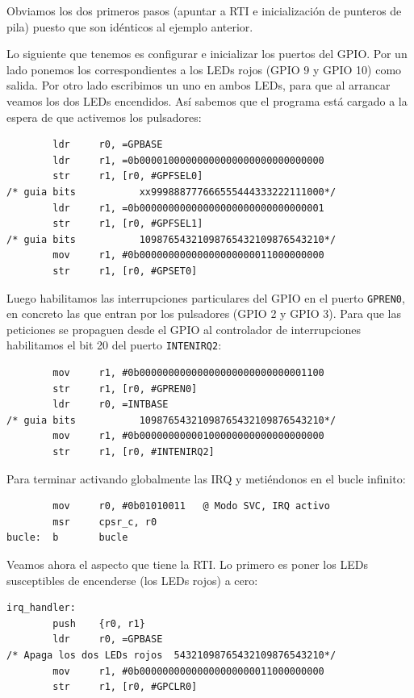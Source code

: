 Obviamos los dos primeros pasos (apuntar a RTI e inicialización de punteros de pila) puesto
que son idénticos al ejemplo anterior.

Lo siguiente que tenemos es configurar e inicializar los puertos del GPIO. Por un lado
ponemos los correspondientes a los LEDs rojos (GPIO 9 y GPIO 10) como salida. Por otro
lado escribimos un uno en ambos LEDs, para que al arrancar veamos los dos LEDs encendidos.
Así sabemos que el programa está cargado a la espera de que activemos los pulsadores:

\begin{lstlisting}
        ldr     r0, =GPBASE
        ldr     r1, =0b00001000000000000000000000000000
        str     r1, [r0, #GPFSEL0]
/* guia bits           xx999888777666555444333222111000*/
        ldr     r1, =0b00000000000000000000000000000001
        str     r1, [r0, #GPFSEL1]
/* guia bits           10987654321098765432109876543210*/
        mov     r1, #0b00000000000000000000011000000000
        str     r1, [r0, #GPSET0]
\end{lstlisting}

Luego habilitamos las interrupciones particulares del GPIO en el puerto
{\tt GPREN0}, en concreto las que entran por los pulsadores (GPIO 2 y GPIO 3). 
Para que las peticiones se propaguen desde el GPIO al controlador de interrupciones
habilitamos el bit 20 del puerto {\tt INTENIRQ2}:

\begin{lstlisting}
        mov     r1, #0b00000000000000000000000000001100
        str     r1, [r0, #GPREN0]
        ldr     r0, =INTBASE
/* guia bits           10987654321098765432109876543210*/
        mov     r1, #0b00000000000100000000000000000000
        str     r1, [r0, #INTENIRQ2]
\end{lstlisting}

Para terminar activando globalmente las IRQ y metiéndonos en el bucle infinito:

\begin{lstlisting}
        mov     r0, #0b01010011   @ Modo SVC, IRQ activo
        msr     cpsr_c, r0
bucle:  b       bucle
\end{lstlisting}

Veamos ahora el aspecto que tiene la RTI. Lo primero es poner los LEDs susceptibles de
encenderse (los LEDs rojos) a cero:

\begin{lstlisting}
irq_handler:
        push    {r0, r1}
        ldr     r0, =GPBASE
/* Apaga los dos LEDs rojos  54321098765432109876543210*/
        mov     r1, #0b00000000000000000000011000000000
        str     r1, [r0, #GPCLR0]
\end{lstlisting}

